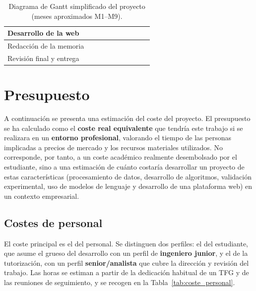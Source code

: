 \begin{table}[ht]
\begin{tabular}{|l|c|c|c|c|c|c|c|c|c|}
\hline
Desarrollo de la web                 &                    &                    &                    &                    &                    &                    & \cellcolor{gray75} & \cellcolor{gray75} &                    \\
\hline
Redacción de la memoria              &                    &                    & \cellcolor{gray75} & \cellcolor{gray75} & \cellcolor{gray75} & \cellcolor{gray75} & \cellcolor{gray75} & \cellcolor{gray75} & \cellcolor{gray75} \\
\hline
Revisión final y entrega             &                    &                    &                    &                    &                    &                    &                    &                    & \cellcolor{gray75} \\
\hline
\end{tabular}
\caption{Diagrama de Gantt simplificado del proyecto (meses aproximados M1--M9).}
\label{tab:gantt}
\end{table}

\section{Presupuesto}
\label{sec:plan_presupuesto}

A continuación se presenta una estimación del coste del proyecto. El presupuesto se ha calculado como el \textbf{coste real equivalente} que tendría este trabajo si se realizara en un \textbf{entorno profesional}, valorando el tiempo de las personas implicadas a precios de mercado y los recursos materiales utilizados. No corresponde, por tanto, a un coste académico realmente desembolsado por el estudiante, sino a una estimación de cuánto costaría desarrollar un proyecto de estas características (procesamiento de datos, desarrollo de algoritmos, validación experimental, uso de modelos de lenguaje y desarrollo de una plataforma web) en un contexto empresarial.

\subsection{Costes de personal}
\label{sec:plan_personal}

El coste principal es el del personal. Se distinguen dos perfiles: el del estudiante, que asume el grueso del desarrollo con un perfil de \textbf{ingeniero junior}, y el de la tutorización, con un perfil \textbf{senior/analista} que cubre la dirección y revisión del trabajo. Las horas se estiman a partir de la dedicación habitual de un TFG y de las reuniones de seguimiento, y se recogen en la Tabla~\ref{tab:coste_personal}.

